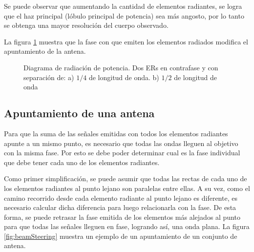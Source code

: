Se puede observar que aumentando la cantidad de elementos radiantes, se logra que el haz principal (lóbulo principal de
potencia) sea más angosto, por lo tanto se obtenga una mayor resolución del cuerpo observado. 

La figura \ref{fig:directArrayPat} muestra que la fase con que emiten los elementos radiados modifica el apuntamiento de la 
antena.

\begin{figure}[H]
	\centering
	\caption{Diagrama de radiación de potencia. Dos ERs en contrafase y con separación de: a) $1/4$ de longitud de onda. b) $1/2$ 
		de longitud de onda}
	\label{fig:directArrayPat}
\end{figure}


\subsection{Apuntamiento de una antena}\label{ssec:beamSteering}

Para que la suma de las señales emitidas con todos los elementos radiantes apunte a un mismo punto, es necesario que
todas las ondas lleguen al objetivo con la misma fase. Por esto se debe poder determinar cual es la fase individual que
debe tener cada uno de los elementos radiantes.

Como primer simplificación, se puede asumir que todas las rectas de cada uno de los elementos radiantes al punto lejano son
paralelas entre ellas. A su vez, como el camino recorrido desde cada elemento radiante al punto lejano es diferente, es
necesario calcular dicha diferencia para luego relacionarla con la fase. De esta forma, se puede retrasar la fase emitida de
los elementos más alejados al punto para que todas las señales lleguen en fase, logrando así, una onda plana. La figura 
\ref{fig:beamSteering} muestra un ejemplo de un apuntamiento de un conjunto de antena.

